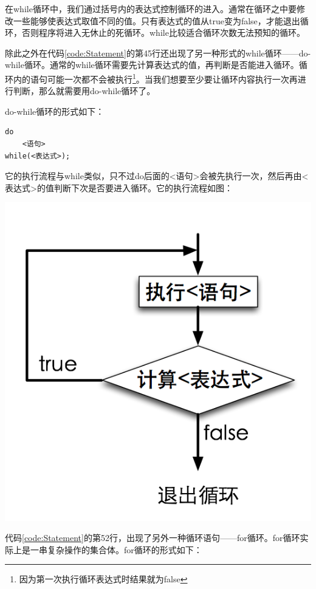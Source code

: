在while循环中，我们通过括号内的表达式控制循环的进入。通常在循环之中要修改一些能够使表达式取值不同的值。只有表达式的值从true变为false，才能退出循环，否则程序将进入无休止的死循环。while比较适合循环次数无法预知的循环。

除此之外在代码\ref{code:Statement}的第45行还出现了另一种形式的while循环——do-while循环。通常的while循环需要先计算表达式的值，再判断是否能进入循环。循环内的语句可能一次都不会被执行\footnote{因为第一次执行循环表达式时结果就为false}。当我们想要至少要让循环内容执行一次再进行判断，那么就需要用do-while循环了。

do-while循环的形式如下：

\begin{lstlisting}[xleftmargin=10em,xrightmargin=10em]
do
    <语句>
while(<表达式>);
\end{lstlisting}

它的执行流程与while类似，只不过do后面的<语句>会被先执行一次，然后再由<表达式>的值判断下次是否要进入循环。它的执行流程如图：

\begin{center}
\includegraphics{fig/1-6/3_dowhile_statement.png}
\end{center}

代码\ref{code:Statement}的第52行，出现了另外一种循环语句——for循环。for循环实际上是一串复杂操作的集合体。for循环的形式如下：


